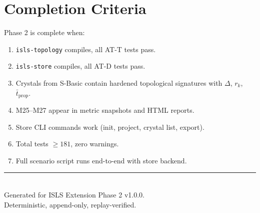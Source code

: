 \documentclass[11pt,a4paper,twoside]{article}
\theoremstyle{definition}
\theoremstyle{plain}
\theoremstyle{remark}
\newcommand{\ISLS}{\textsf{ISLS}}
\begin{document}
\section{Completion Criteria}

Phase 2 is complete when:
\begin{enumerate}[nosep]
  \item \texttt{isls-topology} compiles, all AT-T tests pass.
  \item \texttt{isls-store} compiles, all AT-D tests pass.
  \item Crystals from S-Basic contain hardened topological signatures
        with $\Delta$, $r_k$, $\bar{t}_{\mathrm{prop}}$.
  \item M25--M27 appear in metric snapshots and HTML reports.
  \item Store CLI commands work (init, project, crystal list, export).
  \item Total tests $\ge 181$, zero warnings.
  \item Full scenario script runs end-to-end with store backend.
\end{enumerate}


\vfill
\begin{center}
\rule{0.5\textwidth}{0.4pt}\\[0.5cm]
{\small Generated for \ISLS{} Extension Phase 2 v1.0.0.\\
Deterministic, append-only, replay-verified.}
\end{center}
\end{document}
